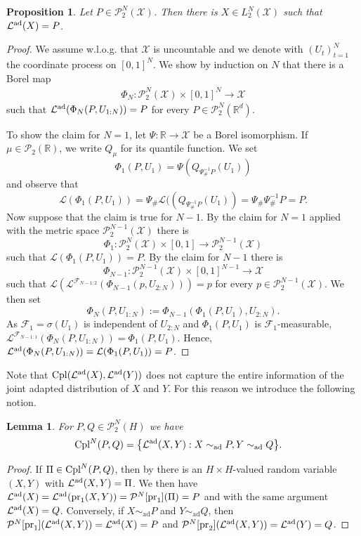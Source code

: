 \documentclass[a4paper]{amsart}
\numberwithin{theorem}{section}
\newtheorem{lemma}[theorem]{Lemma}
\newtheorem{proposition}[theorem]{Proposition}
\theoremstyle{definition}
\newcommand{\R}{\mathbb{R}}
\newcommand{\Xs}{\mathcal X}
\newcommand{\F}{\mathcal{F}}
\newcommand{\pr}{\textup{pr}}
\newcommand{\law}{\mathcal{L}}
\newcommand{\cpl}{\textup{Cpl}}
\newcommand{\Pc}{\mathcal P}
\newcommand{\simad}{\sim_{\mathrm{ad}}}
\renewcommand{\H}{H}
\newcommand{\lawad}{\law^{\textup{ad}}}
\begin{document}
\begin{proposition}\label{prop:ReprLawadAsRV}
    Let $P \in \Pc_2^N(\mathcal{X})$. Then there is $X \in L_2^N(\Xs)$ such that $\lawad(X)=P$.  
\end{proposition}
\begin{proof}
We assume w.l.o.g. that $\mathcal{X}$ is uncountable and  we denote with $(U_t)_{t=1}^N$ the coordinate process on $[0,1]^N$. We show by induction on $N$ that there is a Borel map 
\begin{align*}
    \Phi_N : \Pc_2^N(\mathcal{X}) \times  [0,1]^N \to \mathcal{X}
\end{align*}
such that $\lawad(\Phi_N(P,U_{1:N}))=P$ for every $P \in \Pc_2^N(\R^d)$.

To show the claim for $N=1$, let $\Psi: \R \to \mathcal{X}$ be a Borel isomorphism. If $\mu \in\Pc_2(\R)$, we write $Q_\mu$ for its quantile function. We set 
\[
\Phi_1(P,U_1) = \Psi(Q_{\Psi^{-1}_\#P}(U_1))
\]
and observe that 
\[
\law( \Phi_1(P,U_1) ) = \Psi_\# \law( (Q_{\Psi^{-1}_\#P}(U_1) ) = \Psi_\#\Psi^{-1}_\#P=P.
\]
Now suppose that the claim is true for $N-1$. By the claim for $N=1$ applied with the metric space $\Pc_2^{N-1}(\mathcal{X})$ there is 
\[
\Phi_1 : \Pc_2^N(\mathcal{X}) \times [0,1] \to \Pc_2^{N-1}(\mathcal{X})
\]
such that $\law( \Phi_1(P,U_1)) = P$. 
By the claim for $N-1$ there is 
\[
\Phi_{N-1} : \Pc_2^{N-1}(\mathcal{X}) \times [0,1]^{N-1} \to \mathcal{X}
\]
such that $\law(\law^{\F_{N-1:2}}(\Phi_{N-1}(p,U_{2:N}))) = p$ for every $p \in \Pc_2^{N-1}(\mathcal{X})$. 
We then set
\[
\Phi_N(P,U_{1:N}) := \Phi_{N-1}(\Phi_1(P,U_1),U_{2:N}).
\]
As $\F_1=\sigma(U_1)$ is independent of $U_{2:N}$ and $\Phi_1(P,U_1)$ is $\F_1$-measurable, 
$
\law^{\F_{N-1:1}}( \Phi_N(P,U_{1:N}) ) = \Phi_1(P,U_1).
$
Hence, $\lawad(\Phi_N(P,U_{1:N})) = \law(\Phi_1(P,U_1)) =P$.
\end{proof}


Note that $\cpl(\lawad(X),\lawad(Y))$ does not capture the entire information of the joint adapted distribution of $X$ and $Y$. For this reason we introduce the following notion.



\begin{lemma} \label{lem:cplN}
For $P, Q \in \Pc_2^N(\H)$ we have 
\begin{align*}
    \cpl^N(P,Q) &=  \big\{   \lawad( X,Y )   : X \simad  P, Y \simad Q  \big \}. 
\end{align*}
\end{lemma}
\begin{proof}
If $\Pi \in \cpl^N(P,Q)$, then by  there is an $\H \times \H$-valued random variable $(X,Y)$ with $\lawad(X,Y)=\Pi$. We then have $\lawad(X) = \lawad(\pr_1(X,Y))= \Pc^N[\pr_1](\Pi)=P$ and with the same argument $\lawad(X) = Q$. Conversely, if $X \simad P$ and $Y \simad Q$, then $\Pc^N[\pr_1](\lawad(X,Y))=\lawad(X)=P$ and $\Pc^N[\pr_2](\lawad(X,Y))=\lawad(Y)=Q$.
\end{proof}
\end{document}
